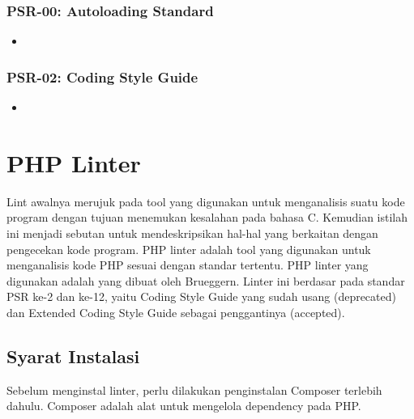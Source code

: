 \subsubsection{PSR-00: Autoloading Standard}
\label{subsubsec:psr00}
\begin{itemize}
	\item
\end{itemize}

\subsubsection{PSR-02: Coding Style Guide}
\label{subsubsec:psr02}
\begin{itemize}
	\item
\end{itemize}



\section{PHP Linter}
\label{sec:phplinter}
 
Lint awalnya merujuk pada tool yang digunakan untuk menganalisis suatu kode program dengan tujuan menemukan kesalahan pada bahasa C. Kemudian istilah ini menjadi sebutan untuk mendeskripsikan hal-hal yang berkaitan dengan pengecekan kode program. PHP linter adalah tool yang digunakan untuk menganalisis kode PHP sesuai dengan standar tertentu. 
PHP linter yang digunakan adalah yang dibuat oleh Brueggern. Linter ini berdasar pada standar PSR ke-2 dan ke-12, yaitu Coding Style Guide yang sudah usang (deprecated) dan Extended Coding Style Guide sebagai penggantinya (accepted). 


\subsection{Syarat Instalasi}
Sebelum menginstal linter, perlu dilakukan penginstalan Composer terlebih dahulu. Composer adalah alat untuk mengelola dependency pada PHP. 

